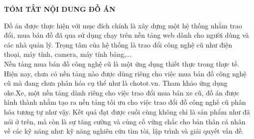 \documentclass[../DoAn.tex]{subfiles}
\begin{document}
\begin{center}
    \Large{\textbf{TÓM TẮT NỘI DUNG ĐỒ ÁN}}\\
\end{center}
\vspace{1cm}

Đồ án được thực hiện với mục đích chính là xây dựng một hệ thống nhằm trao đổi, mua bán đồ đã qua sử dụng chạy trên nền tảng web dành cho người dùng và các nhà quản lý. Trọng tâm của hệ thống là trao đổi công nghệ cũ như điện thoại, máy tính, camera, máy tính bảng,...\\
Nền tảng mua bán đồ công nghệ cũ là một ứng dụng thiết thực trong thực tế. Hiện nay, chưa có nền tảng nào được dùng riêng cho việc mua bán đồ công nghệ cũ mà đang chưa phân hóa cụ thể như là chotot.vn. Tham khảo ứng dụng oke.Xe, một nền tảng dành riêng cho việc trao đổi mua bán xe cũ, đồ án được hình thành nhằm tạo ra nền tảng tối ưu cho việc trao đổi đồ công nghê cũ phân hóa tương tự như vậy. Kết quả đạt được cuối cùng không chỉ là sản phẩm như đã nói ở trên, mà còn là sự tăng cường và củng cố vững chắc cho bản thân cá nhân về các kỹ năng như: kỹ năng nghiên cứu tìm tòi, lập trình và giải quyết vấn đề.
\end{document}

